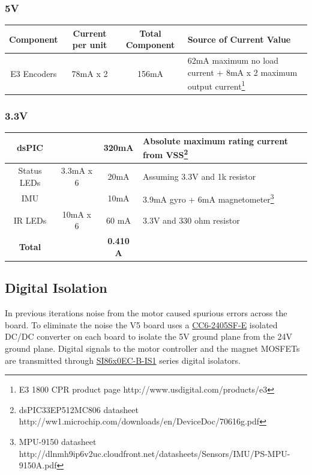 \documentclass{article}
\begin{document}
\subsubsection*{5V}
\begin{longtable}{|c | c | c |  >{\centering\arraybackslash}p{} |} \hline
Component & Current per unit & Total Component & Source of Current Value\\ \hline
E3 Encoders & 78mA x 2 & 156mA & 62mA maximum no load current + 8mA x 2 maximum output current\footnote{E3 1800 CPR product page http://www.usdigital.com/products/e3}\\ \hline
\end{longtable}
\subsubsection*{3.3V}
\begin{longtable}{|c | c | c |  >{\centering\arraybackslash}p{} |} \hline
dsPIC && 320mA & Absolute maximum rating current from VSS\footnote{dsPIC33EP512MC806 datasheet http://ww1.microchip.com/downloads/en/DeviceDoc/70616g.pdf}\\ \hline
Status LEDs & 3.3mA x 6& 20mA & Assuming 3.3V and 1k resistor\\ \hline
IMU && 10mA & 3.9mA gyro + 6mA magnetometer\footnote{MPU-9150 datasheet http://dlnmh9ip6v2uc.cloudfront.net/datasheets/Sensors/IMU/PS-MPU-9150A.pdf} \\ \hline
IR LEDs &10mA x 6 & 60 mA & 3.3V  and 330 ohm resistor\\ \hline
\textbf{Total} && \textbf{0.410 A} &\\ \hline
\end{longtable}
\addtocounter{table}{-4}  %

\subsection{Digital Isolation}
In previous iterations noise from the motor caused spurious errors across the board. To eliminate the noise the V5 board uses a \href{http://www.digikey.com/product-search/en?vendor=0&keywords=CC6-2405SF-E}{CC6-2405SF-E} isolated DC/DC converter on each board to isolate the 5V ground plane from the 24V ground plane. Digital signals to the motor controller and the magnet MOSFETs are transmitted through \href{http://www.digikey.com/product-detail/en/SI8610EC-B-IS/336-2058-5-ND/2623300}{SI86x0EC-B-IS1} series digital isolators.
\end{document}
